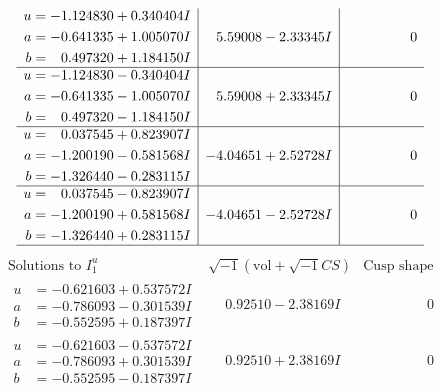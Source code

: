\documentclass[1p]{elsarticle_modified}
\theoremstyle{definition}
\newcommand{\I}{\sqrt{-1}}
\begin{document}
$$\begin{array}{c|c|c}
\begin{aligned}
u &= -1.124830 + 0.340404 I \\
a &= -0.641335 + 1.005070 I \\
b &= \phantom{-}0.497320 + 1.184150 I\end{aligned}
 & \phantom{-}5.59008 - 2.33345 I & \phantom{-0.000000 } 0 \\ \hline\begin{aligned}
u &= -1.124830 - 0.340404 I \\
a &= -0.641335 - 1.005070 I \\
b &= \phantom{-}0.497320 - 1.184150 I\end{aligned}
 & \phantom{-}5.59008 + 2.33345 I & \phantom{-0.000000 } 0 \\ \hline\begin{aligned}
u &= \phantom{-}0.037545 + 0.823907 I \\
a &= -1.200190 - 0.581568 I \\
b &= -1.326440 - 0.283115 I\end{aligned}
 & -4.04651 + 2.52728 I & \phantom{-0.000000 } 0 \\ \hline\begin{aligned}
u &= \phantom{-}0.037545 - 0.823907 I \\
a &= -1.200190 + 0.581568 I \\
b &= -1.326440 + 0.283115 I\end{aligned}
 & -4.04651 - 2.52728 I & \phantom{-0.000000 } 0\\
 \hline 
 \end{array}$$\newpage$$\begin{array}{c|c|c}  
\text{Solutions to }I^u_{1}& \I (\text{vol} + \sqrt{-1}CS) & \text{Cusp shape}\\
 \hline 
\begin{aligned}
u &= -0.621603 + 0.537572 I \\
a &= -0.786093 - 0.301539 I \\
b &= -0.552595 + 0.187397 I\end{aligned}
 & \phantom{-}0.92510 - 2.38169 I & \phantom{-0.000000 } 0 \\ \hline\begin{aligned}
u &= -0.621603 - 0.537572 I \\
a &= -0.786093 + 0.301539 I \\
b &= -0.552595 - 0.187397 I\end{aligned}
 & \phantom{-}0.92510 + 2.38169 I & \phantom{-0.000000 } 0 \\ \hline\begin{aligned}

\end{aligned}
\end{array}$$
\end{document}
